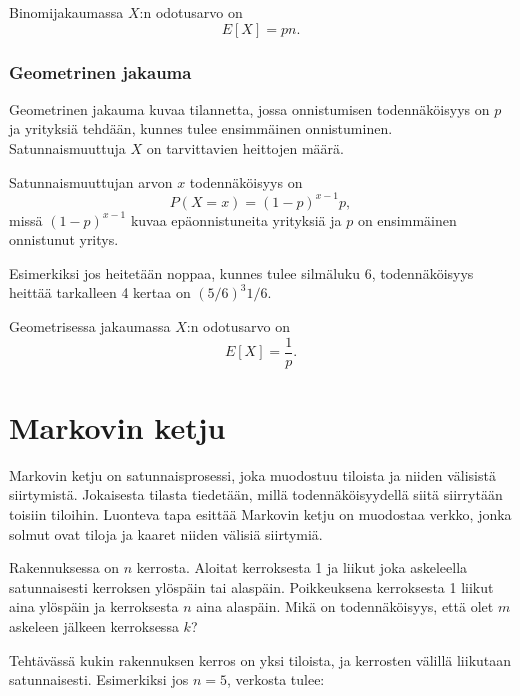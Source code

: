 Binomijakaumassa $X$:n odotusarvo on
\[E[X] = pn.\]

\subsubsection*{Geometrinen jakauma}

Geometrinen jakauma kuvaa tilannetta,
jossa onnistumisen todennäköisyys on $p$
ja yrityksiä tehdään, kunnes tulee ensimmäinen
onnistuminen. Satunnaismuuttuja $X$ on
tarvittavien heittojen määrä.

Satunnaismuuttujan arvon $x$ todennäköisyys on
\[P(X=x)=(1-p)^{x-1} p,\]
missä $(1-p)^{x-1}$ kuvaa epäonnistuneita yrityksiä ja
$p$ on ensimmäinen onnistunut yritys.

Esimerkiksi jos heitetään noppaa,
kunnes tulee silmäluku 6, todennäköisyys
heittää tarkalleen 4 kertaa on $(5/6)^3 1/6$.

Geometrisessa jakaumassa $X$:n odotusarvo on
\[E[X]=\frac{1}{p}.\]

\section{Markovin ketju}


Markovin ketju on satunnaisprosessi,
joka muodostuu tiloista ja niiden välisistä siirtymistä.
Jokaisesta tilasta tiedetään, millä todennäköisyydellä
siitä siirrytään toisiin tiloihin.
Luonteva tapa esittää Markovin ketju on
muodostaa verkko, jonka solmut ovat tiloja
ja kaaret niiden välisiä siirtymiä.

\begin{task}
Rakennuksessa on $n$ kerrosta.
Aloitat kerroksesta 1 ja liikut joka askeleella
satunnaisesti kerroksen ylöspäin tai alaspäin.
Poikkeuksena kerroksesta 1 liikut aina ylöspäin
ja kerroksesta $n$ aina alaspäin.
Mikä on todennäköisyys, että olet $m$
askeleen jälkeen kerroksessa $k$?
\end{task}

Tehtävässä kukin rakennuksen kerros
on yksi tiloista, ja kerrosten välillä liikutaan
satunnaisesti.
Esimerkiksi jos $n=5$, verkosta tulee:

